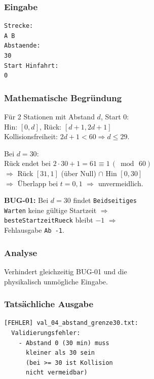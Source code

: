 \documentclass[12pt,a4paper]{article}
\begin{document}
\noindent
\begin{minipage}[t]{0.48\textwidth}
\scriptsize
\setlength{\tabcolsep}{2pt}

\subsubsection*{Eingabe}
\begin{lstlisting}
Strecke:
A B
Abstaende:
30
Start Hinfahrt:
0
\end{lstlisting}

\subsubsection*{Mathematische Begründung}
Für 2 Stationen mit Abstand $d$, Start 0:\\
Hin: $[0, d]$, Rück: $[d+1, 2d+1]$\\
Kollisionsfreiheit: $2d+1 < 60 \Rightarrow d \leq 29$.

\vspace{4pt}
Bei $d = 30$:\\
Rück endet bei $2\cdot30+1 = 61 \equiv 1\,(\bmod\,60)$\\
$\Rightarrow$ Rück $[31,1]$ (über Null) $\cap$ Hin $[0,30]$\\
$\Rightarrow$ Überlapp bei $t = 0, 1$ $\Rightarrow$ unvermeidlich.

\vspace{4pt}
\textbf{BUG-01:} Bei $d=30$ findet \texttt{Beidseitiges}\\
\texttt{Warten} keine gültige Startzeit $\Rightarrow$\\
\texttt{besteStartzeitRueck} bleibt $-1$ $\Rightarrow$\\
Fehlausgabe \texttt{Ab -1}.

\subsubsection*{Analyse}
Verhindert gleichzeitig BUG-01 und die\\
physikalisch unmögliche Eingabe.
\end{minipage}
\hfill
\begin{minipage}[t]{0.48\textwidth}
\scriptsize
\subsubsection*{Tatsächliche Ausgabe}
\begin{lstlisting}
[FEHLER] val_04_abstand_grenze30.txt:
  Validierungsfehler:
    - Abstand 0 (30 min) muss
      kleiner als 30 sein
      (bei >= 30 ist Kollision
      nicht vermeidbar)
\end{lstlisting}
\end{minipage}
\end{document}
